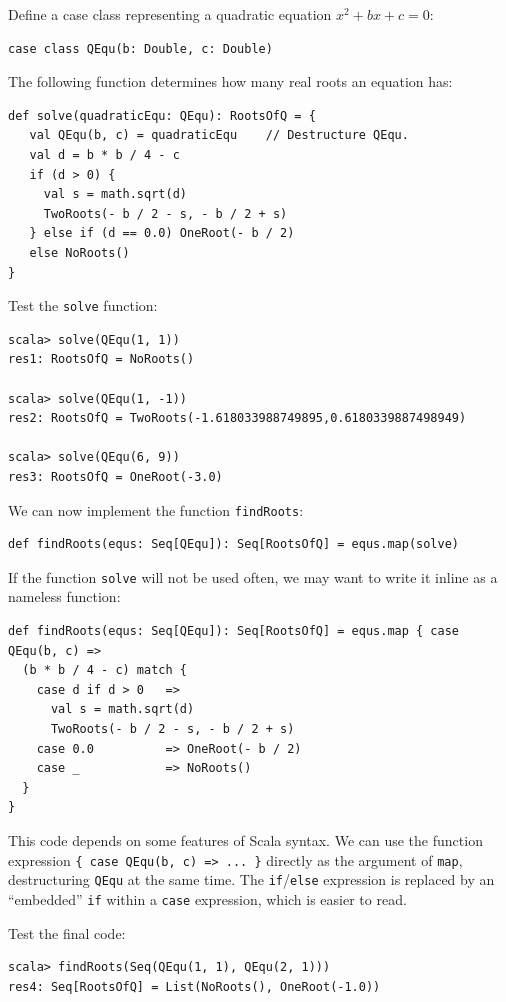 Define a case class representing a quadratic equation $x^{2}+bx+c=0$:
\begin{lstlisting}
case class QEqu(b: Double, c: Double)
\end{lstlisting}
The following function determines how many real roots an equation
has:
\begin{lstlisting}
def solve(quadraticEqu: QEqu): RootsOfQ = {
   val QEqu(b, c) = quadraticEqu    // Destructure QEqu.
   val d = b * b / 4 - c
   if (d > 0) {
     val s = math.sqrt(d)
     TwoRoots(- b / 2 - s, - b / 2 + s)
   } else if (d == 0.0) OneRoot(- b / 2)
   else NoRoots()
}
\end{lstlisting}
Test the \lstinline!solve! function:
\begin{lstlisting}
scala> solve(QEqu(1, 1))
res1: RootsOfQ = NoRoots()

scala> solve(QEqu(1, -1))
res2: RootsOfQ = TwoRoots(-1.618033988749895,0.6180339887498949) 

scala> solve(QEqu(6, 9))
res3: RootsOfQ = OneRoot(-3.0) 
\end{lstlisting}
We can now implement the function \lstinline!findRoots!:
\begin{lstlisting}
def findRoots(equs: Seq[QEqu]): Seq[RootsOfQ] = equs.map(solve)
\end{lstlisting}
If the function \lstinline!solve! will not be used often, we may
want to write it inline as a nameless function:
\begin{lstlisting}
def findRoots(equs: Seq[QEqu]): Seq[RootsOfQ] = equs.map { case QEqu(b, c) =>
  (b * b / 4 - c) match {
    case d if d > 0   =>
      val s = math.sqrt(d)
      TwoRoots(- b / 2 - s, - b / 2 + s)
    case 0.0          => OneRoot(- b / 2)
    case _            => NoRoots()
  }
}
\end{lstlisting}
This code depends on some features of Scala syntax. We can use the
function expression \lstinline!{ case QEqu(b, c) => ... }! directly
as the argument of \lstinline!map!, destructuring \lstinline!QEqu!
at the same time. The \lstinline!if!/\lstinline!else! expression
is replaced by an \textsf{``}embedded\textsf{''}
\lstinline!if! within a \lstinline!case! expression, which is easier
to read.

Test the final code:
\begin{lstlisting}
scala> findRoots(Seq(QEqu(1, 1), QEqu(2, 1)))
res4: Seq[RootsOfQ] = List(NoRoots(), OneRoot(-1.0)) 
\end{lstlisting}


